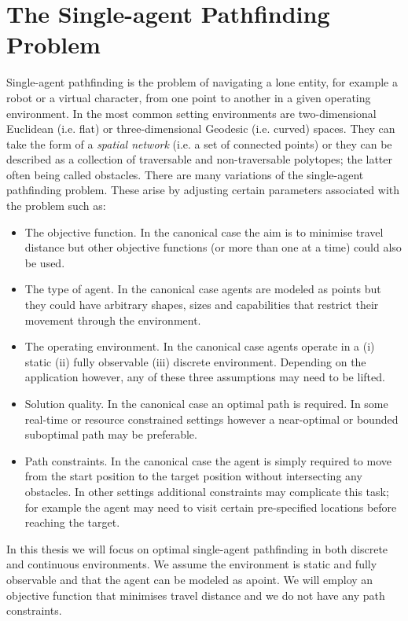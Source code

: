 \section{The Single-agent Pathfinding Problem}
\label{cha::lit::problem}
Single-agent pathfinding is the problem of navigating a lone entity, for example
a robot or a virtual character, from one point to another in a given operating 
environment.  In the most common setting environments are two-dimensional
Euclidean (i.e.  flat) or three-dimensional Geodesic (i.e.  curved) spaces. They
can take the form of a \emph{spatial network} (i.e. a set of connected points)
or they can be described as a collection of traversable and non-traversable
polytopes; the latter often being called obstacles.  There are many variations
of the single-agent pathfinding problem. These arise by adjusting certain
parameters associated with the problem such as:
\begin{itemize}
\item The objective function. In the canonical case the aim is to minimise
travel distance but other objective functions (or more than one at a
time) could also be used.
\item The type of agent. In the canonical case agents are modeled as points
but they could have arbitrary shapes, sizes and capabilities that 
restrict their movement through the environment.
\item The operating environment. In the canonical case agents operate in a 
(i) static (ii) fully observable (iii) discrete environment. 
Depending on the application however, any of these three assumptions may need 
to be lifted.
\item Solution quality. In the canonical case an optimal path is required. 
In some real-time or resource constrained settings however a near-optimal 
or bounded suboptimal path may be preferable.
\item Path constraints. In the canonical case  the agent is simply required 
to move from the start position to the target position without intersecting
any obstacles. In other settings additional constraints may complicate this
task; for example the agent may need to visit certain pre-specified locations 
before reaching the target.
\end{itemize}

In this thesis we will focus on optimal single-agent pathfinding 
in both discrete and continuous environments. We assume the environment is
static and fully observable and that the agent can be modeled as apoint.
We will employ an objective function that minimises travel distance and 
we do not have any path constraints.

